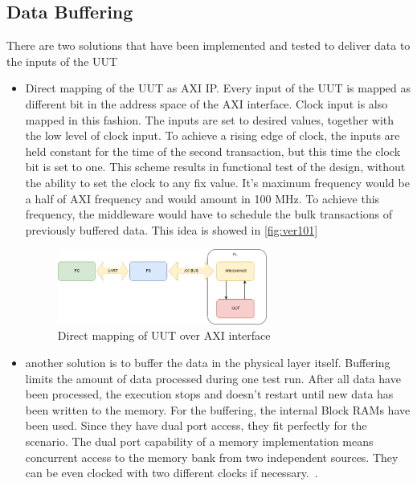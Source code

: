 \subsection{Data Buffering}
There are two solutions that have been implemented and tested to deliver data to the inputs of the UUT
\begin{itemize}
    \item Direct mapping of the UUT as AXI IP. Every input of the UUT is mapped as different bit in the address space of the AXI interface. Clock input is also mapped in this fashion. The inputs are set to desired values, together with the low level of clock input. To achieve a rising edge of clock, the inputs are held constant for the time of the second transaction, but this time the clock bit is set to one. This scheme results in functional test of the design, without the ability to set the clock to any fix value. It's maximum frequency would be a half of AXI frequency and would amount in 100 MHz. To achieve this frequency, the middleware would have to schedule the bulk transactions of previously buffered data. This idea is showed in \autoref{fig:ver101}
\begin{figure}[h]
\centering
\includegraphics[width=0.65\textwidth]{figures/Version101.png}
\caption{Direct mapping of UUT over AXI interface}
\label{fig:ver101}
\end{figure}
    \item another solution is to buffer the data in the physical layer itself. Buffering limits the amount of data processed during one test run. After all data have been processed, the execution stops and doesn't restart until new data has been written to the memory. For the buffering, the internal Block RAMs have been used. Since they have dual port access, they fit perfectly for the scenario. The dual port capability of a memory implementation means concurrent access to the memory bank from two independent sources. They can be even clocked with two different clocks if necessary.~\cite{report:BRAM}.

\end{itemize}
